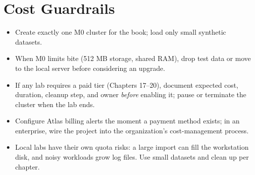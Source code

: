 \section{Cost Guardrails}
%
\begin{itemize}
    \item Create exactly one M0 cluster for the book; load only small synthetic datasets.
    \item When M0 limits bite (512 MB storage, shared RAM), drop test data or move to the local server before considering an upgrade.
    \item If any lab requires a paid tier (Chapters 17--20), document expected cost, duration, cleanup step, and owner \emph{before} enabling it; pause or terminate the cluster when the lab ends.
    \item Configure Atlas billing alerts the moment a payment method exists; in an enterprise, wire the project into the organization's cost-management process.
    \item Local labs have their own quota risks: a large import can fill the workstation disk, and noisy workloads grow log files. Use small datasets and clean up per chapter.
\end{itemize}

